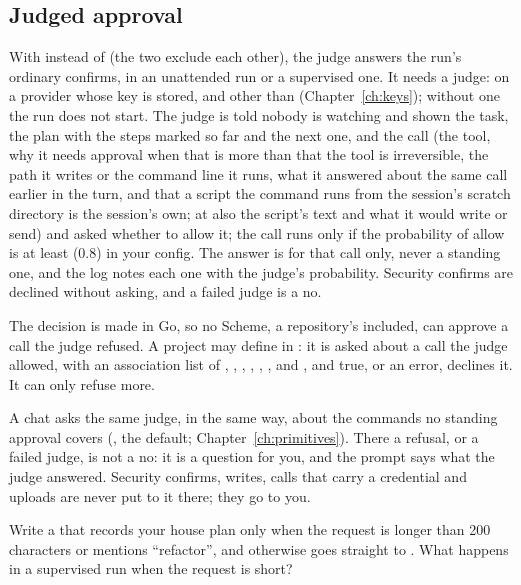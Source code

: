 \subsection{Judged approval}

With  instead of  (the two exclude each
other), the judge answers the run's ordinary confirms, in an unattended run
or a supervised one. It needs a judge: \code{[judge]} on a provider whose
key is stored, and  other than 
(Chapter~\ref{ch:keys}); without
one the run does not start. The judge is told nobody is watching and shown
the task, the plan with the steps marked so far and the next one, and the
call (the tool, why it needs approval when that is more than that the tool
is irreversible, the path it writes or the command line it runs, what it
answered about the same call earlier in the turn, and that a script the
command runs from the session's scratch directory is the session's own; at
 also the script's text and what it would write or
send) and asked whether to allow it; the call runs only if the probability
of allow is at least  (0.8) in your config.
The answer is for that call only, never a standing one, and the log notes
each one with the judge's probability. Security confirms are declined
without asking, and a failed judge is a no.

The decision is made in Go, so no Scheme, a repository's included, can
approve a call the judge refused. A project may define
 in : it is asked about
a call the judge allowed, with  an association list of
, , , , ,
,  and , and true, or an error,
declines it. It can only refuse more.

A chat asks the same judge, in the same way, about the commands no
standing approval covers (, the
default; Chapter~\ref{ch:primitives}). There a refusal, or a failed judge,
is not a no: it is a question for you, and the prompt says what the judge
answered. Security confirms, writes, calls that carry a credential and
uploads are never put to it there; they go to you.

\begin{puzzle}
Write a  that records your house plan only when the
request is longer than 200 characters or mentions ``refactor'', and
otherwise goes straight to . What happens in a supervised
run when the request is short?
\end{puzzle}

